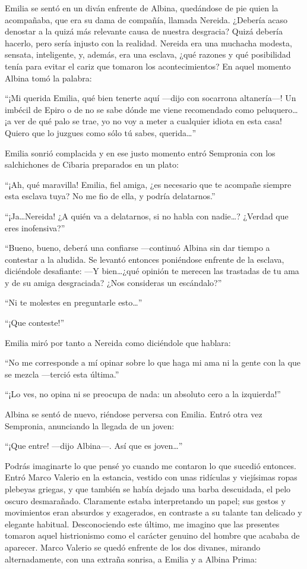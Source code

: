\documentclass[11pt,openany]{book}
\begin{document}
Emilia se sentó en un diván enfrente de Albina, quedándose de pie quien la acompañaba, que era su dama de compañía, llamada Nereida. ¿Debería acaso denostar a la quizá más relevante causa de nuestra desgracia? Quizá debería hacerlo, pero sería injusto con la realidad. Nereida era una muchacha modesta, sensata, inteligente, y, además, era una esclava, ¿qué razones y qué posibilidad tenía para evitar el cariz que tomaron los acontecimientos? En aquel momento Albina tomó la palabra: 

“¡Mi querida Emilia, qué bien tenerte aquí ---dijo con socarrona altanería---!  Un imbécil de Epiro o de no se sabe dónde me viene recomendado como peluquero\dots ¡a ver de qué palo se trae, yo no voy a meter a cualquier idiota en esta casa! Quiero que lo juzgues como sólo tú sabes, querida\dots” 

Emilia sonrió complacida y en ese justo momento entró Sempronia con los salchichones de Cibaria preparados en un plato: 

“¡Ah, qué maravilla! Emilia, fiel amiga, ¿es necesario que te acompañe siempre esta esclava tuya? No me fio de ella, y podría delatarnos.” 

“¡Ja\dots Nereida! ¿A quién va a delatarnos, si no habla con nadie\dots? ¿Verdad que eres inofensiva?” 

“Bueno, bueno, deberá una confiarse —continuó Albina sin dar tiempo a contestar a la aludida. Se levantó entonces poniéndose enfrente de la esclava, diciéndole desafiante: —Y bien\dots ¿qué opinión te merecen las trastadas de tu ama y de su amiga desgraciada? ¿Nos consideras un escándalo?” 

“Ni te molestes en preguntarle esto\dots” 

“¡Que conteste!” 

Emilia miró por tanto a Nereida como diciéndole que hablara: 

“No me corresponde a mí opinar sobre lo que haga mi ama ni la gente con la que se mezcla —terció esta última.” 

“¡Lo ves, no opina ni se preocupa de nada: un absoluto cero a la izquierda!” 

Albina se sentó de nuevo, riéndose perversa con Emilia. Entró otra vez Sempronia, anunciando la llegada de un joven: 

“¡Que entre! —dijo Albina—. Así que es joven\dots” 

Podrás imaginarte lo que pensé yo cuando me contaron lo que sucedió entonces. Entró Marco Valerio en la estancia, vestido con unas ridículas y viejísimas ropas plebeyas griegas, y que también se había dejado una barba descuidada, el pelo oscuro desmarañado. Claramente estaba interpretando un papel; sus gestos y movimientos eran absurdos y exagerados, en contraste a su talante tan delicado y elegante habitual. Desconociendo este último, me imagino que las presentes tomaron aquel histrionismo como el carácter genuino del hombre que acababa de aparecer. Marco Valerio se quedó enfrente de los dos divanes, mirando alternadamente, con una extraña sonrisa, a Emilia y a Albina Prima: 
\end{document}
